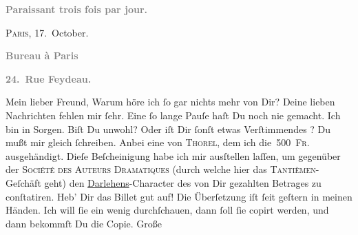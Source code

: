 \begin{ledgroupsized}[t]{13cm}
           \pstart
           \begin{otherlanguage}{french}\textcolor{gray}{\textbf{\textbf{Paraissant trois fois par jour.}}}\end{otherlanguage}\hfill \textsc{Paris}, 17. October.\pend
           \pstart
           \begin{otherlanguage}{french}\textcolor{gray}{\textbf{\textbf{Bureau à Paris}}}\end{otherlanguage}\pend
           \pstart
           \begin{otherlanguage}{french}\textcolor{gray}{\textbf{\textbf{24. Rue Feydeau.}}}\end{otherlanguage}\pend
           \pstart\center{}Mein lieber Freund,\pend\pstart
           Warum höre ich ſo gar nichts mehr von Dir? Deine lieben Nachrichten fehlen mir ſehr.
               Eine ſo lange Pauſe haſt Du noch nie gemacht. Ich bin in Sorgen. Biſt Du unwohl? Oder
               iſt Dir ſonſt etwas Verſtimmendes \label{K_L02787-1v}\label{K_L02787-1h}? Du mußt mir gleich ſchreiben.\pend
           \pstart
           Anbei eine \label{K_L02787-2v}\label{K_L02787-2h} von \textsc{Thorel}, dem ich die 500 \textsc{Fr.} ausgehändigt. Dieſe
               Beſcheinigung habe ich mir ausſtellen laſſen, um gegenüber der \textsc{Société des Auteurs Dramatiques} (durch welche hier das \textsc{Tantièmen}-Geſchäft geht) {\pb}den \uline{Darlehens}-Character des von Dir gezahlten Betrages zu conſtatiren. Heb’ Dir das
               Billet gut auf!\pend
           \pstart
           Die Überſetzung iſt ſeit geſtern in meinen Händen. Ich will ſie ein wenig
               durchſchauen, dann ſoll ſie copirt werden, und dann bekommſt Du die Copie. Große

\end{ledgroupsized}
